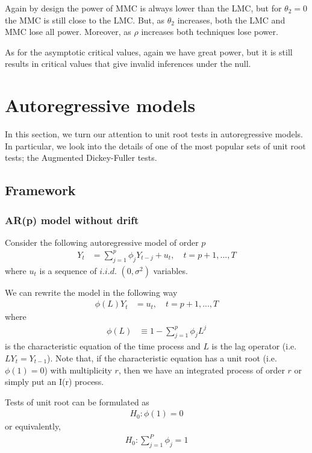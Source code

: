 \documentclass[]{article}\usepackage[]{graphicx}\usepackage[]{color}
\begin{document}
Again by design the power of MMC is always lower than the LMC, but for $\theta_2=0$ the MMC is still close to the LMC. But, as $\theta_2$ increases, both the LMC and MMC lose all power. Moreover, as $\rho$ increases both techniques lose power.

As for the asymptotic critical values, again we have great power, but it is still results in critical values that give invalid inferences under the null.

\section{Autoregressive models}

In this section, we turn our attention to unit root tests in autoregressive models. In particular, we look into the details of one of the most popular sets of unit root tests; the Augmented Dickey-Fuller tests.

\subsection{Framework}

\subsubsection{AR(p) model without drift}

Consider the following autoregressive model of order $p$
\begin{align}
	\label{eq:nc:AR}
	Y_t & = \sum_{j=1}^{p} \phi_j Y_{t-j} + u_t, \quad t = p + 1, ... , T
\end{align}
where $u_t$ is a sequence of $i.i.d.$ $(0,\sigma^2)$ variables.

We can rewrite the model in the following way
\begin{align}
	\phi(L) Y_t & =  u_t, \quad t = p + 1, ... , T
\end{align}
where
\begin{align}
	\phi(L) &\equiv	1-\sum_{j=1}^{p} \phi_j L^j
\end{align}
is the characteristic equation of the time process and $L$ is the lag operator (i.e. $L Y_t = Y_{t-1}$). Note that, if the characteristic equation has a unit root (i.e. $\phi(1)=0$) with multiplicity $r$, then we have an integrated process of order $r$ or simply put an I(r) process.

Tests of unit root can be formulated as
\begin{align}
	H_0: \phi(1)=0
\end{align}
or equivalently,
\begin{align}
	H_0: \sum_{j=1}^{P} \phi_{j} = 1
\end{align}
\end{document}
